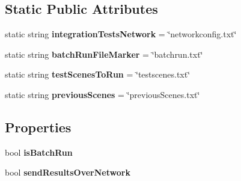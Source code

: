 \subsection*{Static Public Attributes}
\begin{DoxyCompactItemize}
\item 
\mbox{\label{class_unity_test_1_1_test_runner_configurator_aa9fd51e7151a746d047f1c9974005baf}} 
static string {\bfseries integration\+Tests\+Network} = \char`\"{}networkconfig.\+txt\char`\"{}
\item 
\mbox{\label{class_unity_test_1_1_test_runner_configurator_a2947e3249df5c7dbac09f0e6c221abbc}} 
static string {\bfseries batch\+Run\+File\+Marker} = \char`\"{}batchrun.\+txt\char`\"{}
\item 
\mbox{\label{class_unity_test_1_1_test_runner_configurator_acb476cd102dd0dc2142e9368124a283d}} 
static string {\bfseries test\+Scenes\+To\+Run} = \char`\"{}testscenes.\+txt\char`\"{}
\item 
\mbox{\label{class_unity_test_1_1_test_runner_configurator_ad2512d3d0e22f5faf42255088c12d29c}} 
static string {\bfseries previous\+Scenes} = \char`\"{}previous\+Scenes.\+txt\char`\"{}
\end{DoxyCompactItemize}
\subsection*{Properties}
\begin{DoxyCompactItemize}
\item 
\mbox{\label{class_unity_test_1_1_test_runner_configurator_a578c178d571184a5fc3d459b33382d11}} 
bool {\bfseries is\+Batch\+Run}
\item 
\mbox{\label{class_unity_test_1_1_test_runner_configurator_aa39dc5b53b13c031628fd2a750a6a234}} 
bool {\bfseries send\+Results\+Over\+Network}
\end{DoxyCompactItemize}
